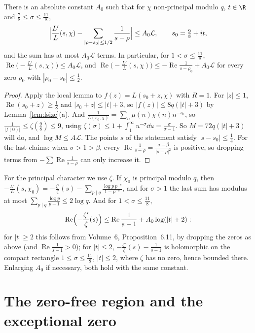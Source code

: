 \begin{lemma}[$\frac{L'}L$ near the line $\sigma=1$]\label{lem:lnear}
There is an absolute constant $A_0$ such that for $\chi$ non-principal modulo $q$, $t\in\R$ and $\frac78\le\sigma\le\frac{11}8$,
\[
\Bigl|\frac{L'}L(s,\chi)-\sum_{|\rho-s_0|\le1/2}\frac1{s-\rho}\Bigr|\le A_0\mathcal L,\qquad s_0=\tfrac98+it,
\]
and the sum has at most $A_0\mathcal L$ terms. In particular, for $1<\sigma\le\frac{11}8$, $\operatorname{Re}\bigl(-\frac{L'}L(s,\chi)\bigr)\le A_0\mathcal L$, and $\operatorname{Re}\bigl(-\frac{L'}L(s,\chi)\bigr)\le-\operatorname{Re}\frac1{s-\rho_0}+A_0\mathcal L$ for every zero $\rho_0$ with $|\rho_0-s_0|\le\frac12$.
\end{lemma}
\begin{proof}
Apply the local lemma to $f(z)=L(s_0+z,\chi)$ with $R=1$. For $|z|\le1$, $\operatorname{Re}(s_0+z)\ge\frac18$ and $|s_0+z|\le|t|+3$, so $|f(z)|\le8q(|t|+3)$ by Lemma~\ref{lem:lsize}(a). And $\frac1{L(s_0,\chi)}=\sum_n\mu(n)\chi(n)n^{-s_0}$, so $\frac1{|f(0)|}\le\zeta(\frac98)\le9$, using $\zeta(\sigma)\le1+\int_1^\infty u^{-\sigma}\dd u=\frac\sigma{\sigma-1}$.
So $M=72q(|t|+3)$ will do, and $\log M\le A\mathcal L$. The points $s$ of the statement satisfy $|s-s_0|\le\frac14$. For the last claims: when $\sigma>1>\beta$, every $\operatorname{Re}\frac1{s-\rho}=\frac{\sigma-\beta}{|s-\rho|^2}$ is positive, so dropping terms from $-\sum\operatorname{Re}\frac1{s-\rho}$ can only increase it.
\end{proof}

For the principal character we use $\zeta$. If $\chi_0$ is principal modulo $q$, then $-\frac{L'}L(s,\chi_0)=-\frac{\zeta'}\zeta(s)-\sum_{p\mid q}\frac{\log p\,p^{-s}}{1-p^{-s}}$, and for $\sigma>1$ the last sum has modulus at most $\sum_{p\mid q}\frac{\log p}{p-1}\le2\log q$. And for $1<\sigma\le\frac{11}8$,
\begin{equation}\label{eq:zetanear}
\operatorname{Re}\Bigl(-\frac{\zeta'}\zeta(s)\Bigr)\le\operatorname{Re}\frac1{s-1}+A_0\log(|t|+2):
\end{equation}
for $|t|\ge2$ this follows from Volume~6, Proposition~6.11, by dropping the zeros as above (and $\operatorname{Re}\frac1{s-1}>0$); for $|t|\le2$, $-\frac{\zeta'}\zeta(s)-\frac1{s-1}$ is holomorphic on the compact rectangle $1\le\sigma\le\frac{11}8$, $|t|\le2$, where $\zeta$ has no zero, hence bounded there. Enlarging $A_0$ if necessary, both hold with the same constant.

\section{The zero-free region and the exceptional zero}

